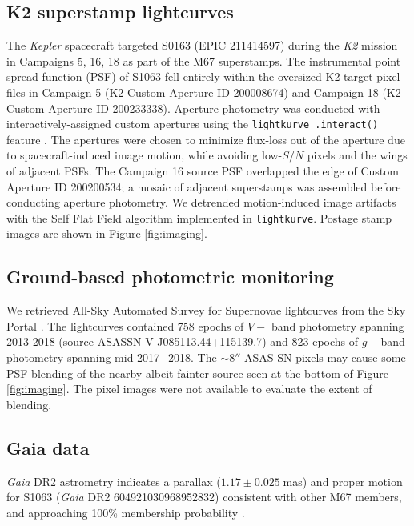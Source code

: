 \documentclass[twocolumn]{emulateapj}%
\begin{document}
\subsection{K2 superstamp lightcurves}
The \emph{Kepler} spacecraft targeted S0163 (EPIC 211414597) during the \emph{K2} mission \citep{howell14} in Campaigns 5, 16, 18 as part of the M67 superstamps.  The instrumental point spread function (PSF) of S1063 fell entirely within the oversized K2 target pixel files in Campaign 5 (K2 Custom Aperture ID 200008674) and Campaign 18 (K2 Custom Aperture ID 200233338).  Aperture photometry was conducted with interactively-assigned custom apertures using the \texttt{lightkurve .interact()} feature \citep{geert_barentsen_2019_2565212}. The apertures were chosen to minimize flux-loss out of the aperture due to spacecraft-induced image motion, while avoiding low-$S/N$ pixels and the wings of adjacent PSFs.  The Campaign 16 source PSF overlapped the edge of Custom Aperture ID 200200534; a mosaic of adjacent superstamps was assembled before conducting aperture photometry.
We detrended motion-induced image artifacts with the Self Flat Field algorithm \citep{vanderburg14} implemented in \texttt{lightkurve}.  Postage stamp images are shown in Figure \ref{fig:imaging}.

\subsection{Ground-based photometric monitoring}
We retrieved All-Sky Automated Survey for Supernovae \citep[ASAS-SN][]{shappee14} lightcurves from the Sky Portal \citep{2017PASP..129j4502K}.  The lightcurves contained 758 epochs of $V-$ band photometry spanning 2013-2018 (source ASASSN-V J085113.44+115139.7) and 823 epochs of $g-$band photometry spanning mid-2017$-$2018.  The $\sim8''$ ASAS-SN pixels may cause some PSF blending of the nearby-albeit-fainter source seen at the bottom of Figure \ref{fig:imaging}.  The pixel images were not available to evaluate the extent of blending.

\subsection{Gaia data}
\emph{Gaia} DR2 astrometry \citep{2016A&A...595A...1G, 2018A&A...616A...1G} indicates a parallax ($1.17\pm0.025 \;$mas) and proper motion for S1063 (\emph{Gaia} DR2 604921030968952832) consistent with other M67 members, and approaching 100\% membership probability \citep{2018ApJ...869....9G}.
\end{document}
